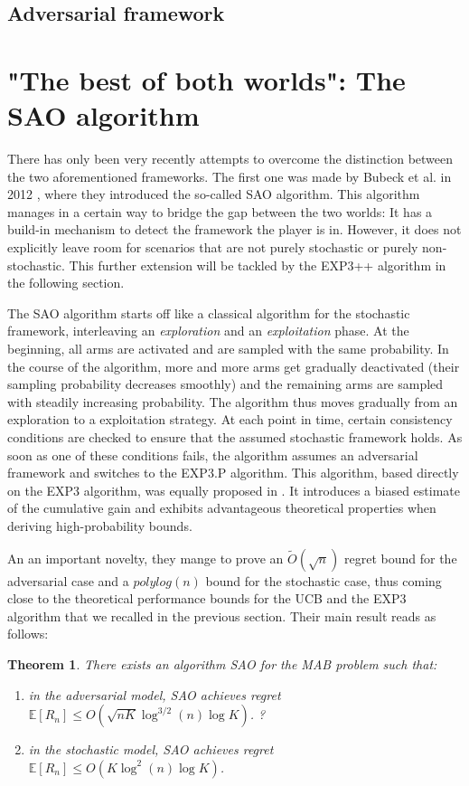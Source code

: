 \documentclass[11pt]{article}
\newtheorem{theorem}{Theorem}
\begin{document}
\subsection*{Adversarial framework}




\section*{"The best of both worlds": The SAO algorithm}

There has only been very recently attempts to overcome the distinction between the two aforementioned frameworks. The first one was made by Bubeck et al. in 2012 \cite{Bube12}, where they introduced the so-called SAO algorithm. This algorithm manages in a certain way to bridge the gap between the two worlds: It has a build-in mechanism to detect the framework the player is in. However, it does not explicitly leave room for scenarios that are not purely stochastic or purely non-stochastic. This further extension will be tackled by the EXP3++ algorithm in the following section.

The SAO algorithm starts off like a classical algorithm for the stochastic framework, interleaving an \textit{exploration} and an \textit{exploitation} phase. At the beginning, all arms are activated and are sampled with the same probability. In the course of the algorithm, more and more arms get gradually deactivated (their sampling probability decreases smoothly) and the remaining arms are sampled with steadily increasing probability. The algorithm thus moves gradually from an exploration to a exploitation strategy. At each point in time, certain consistency conditions are checked to ensure that the assumed stochastic framework holds. As soon as one of these conditions fails, the algorithm assumes an adversarial framework and switches to the EXP3.P algorithm. This algorithm, based directly on the EXP3 algorithm, was equally proposed in \cite{Auer02b}. It introduces a biased estimate of the cumulative gain and exhibits advantageous theoretical properties when deriving high-probability bounds.

An an important novelty, they mange to prove an $\tilde{O}(\sqrt{n})$ regret bound for the adversarial case and a $polylog(n)$ bound for the stochastic case, thus coming close to the theoretical performance bounds for the UCB and the EXP3 algorithm that we recalled in the previous section. Their main result reads as follows:
\begin{theorem}
There exists an algorithm SAO for the MAB problem such that:
\begin{enumerate}
\item[(a)] in the adversarial model, SAO achieves regret $\mathbb{E}[R_n] \leq O(\sqrt{nK} \log^{3/2}(n) \log K)$.
?\item[(b)] in the stochastic model, SAO achieves regret $\mathbb{E}[R_n] \leq O(K \log^{2}(n) \log K)$.\end{enumerate}
\end{theorem}
\end{document}
